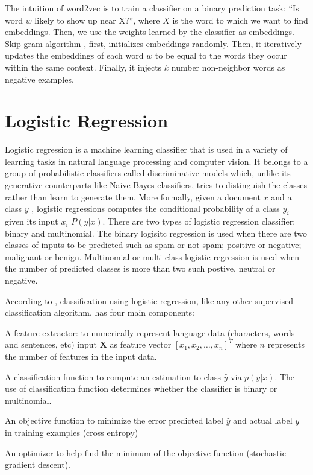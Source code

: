 The intuition of word2vec is to train a classifier on a binary prediction task: “Is
word $w$ likely to show up near X?”, where $X$ is the word to which we want to find embeddings. Then, we use the weights learned by the classifier as embeddings. Skip-gram algorithm \citep{mikolov2013distributed} , first, initializes embeddings randomly. Then, it iteratively updates the embeddings of each word $w$ to be equal to the words they occur within the same context. Finally, it injects $k$ number non-neighbor words as negative examples. 

\section{Logistic Regression}

Logistic regression is a machine learning classifier that is used in a variety of learning tasks in natural language processing and computer vision. It belongs to a group of probabilistic classifiers called discriminative models which, unlike its generative counterparts like Naive Bayes classifiers, tries to distinguish the classes rather than learn to generate them. More formally, given a document $x$ and a class $y$ , logistic regressions computes the conditional probability of a class $y_i$ given its input $x_i$ $P(y|x)$. There are two types of logistic regression classifier: binary and multinomial. The binary logisitc regression is used when there are two classes of inputs to be predicted such as spam or not spam; positive or negative; malignant or benign. Multinomial or multi-class logistic regression is used when the number of predicted classes is more than two such postive, neutral or negative.

 According to \citep{jurafsky2014speech}, classification using logistic regression, like any other supervised classification algorithm, has four main components: 

\begin{list}{•}{}
 \item A feature extractor: to numerically represent language data (characters, words and sentences, etc) input $\mathbf{X}$ as feature vector $\left[x_1,x_2,\ldots,x_n \right]^T$ where $n$  represents the number of features in the input data.

\item A classification function to compute an estimation to class $\hat{y}$ via $p(y|x)$. The use of classification function determines whether the classifier is binary or multinomial. 
 
\item An objective function to minimize the error predicted label $\hat{y}$ and actual label $y$ in training examples (cross entropy)

\item An optimizer to help find the minimum of the objective function 
 (stochastic gradient descent).
 \end{list}

